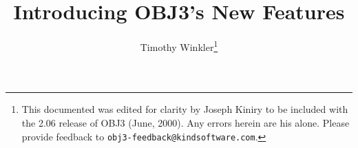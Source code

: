 


\newcommand{\nt}[1]{\mbox{$\langle\!\!\!$ {\it {#1}} $\!\!\rangle$}}
\newcommand{\alt}{$\mid$}
\newcommand{\lopt}{$[$}
\newcommand{\ropt}{$]$}
\newcommand{\lsg}{\{}
\newcommand{\rsg}{\}}
\newcommand{\itr}{$\ldots$}
\newcommand{\itd}{$\ldots$}
\newcommand{\omt}{$\ldots\ldots\ldots$}

\newcommand{\noi}{\noindent}

\def\newblock{}

\setlength{\oddsidemargin}{-.15in}
\setlength{\textwidth}{6in} %
\setlength{\textheight}{8.5in} %
\setlength{\headsep}{-.5in}


\setlength{\oddsidemargin}{.2in}
\setlength{\textwidth}{6in} %
\setlength{\textheight}{8.5in} %
\setlength{\topmargin}{-.05in} %
\setlength{\headsep}{-.05in}

\makeatletter
\makeatother






\title{\vspace{-.75in}Introducing OBJ3's New Features}

\author{Timothy Winkler\footnote{This documented was edited for
    clarity by Joseph Kiniry to be included with the 2.06 release of
    OBJ3 (June, 2000).  Any errors herein are his alone.  Please
    provide feedback to {\tt obj3-feedback@kindsoftware.com}.}}

\maketitle

